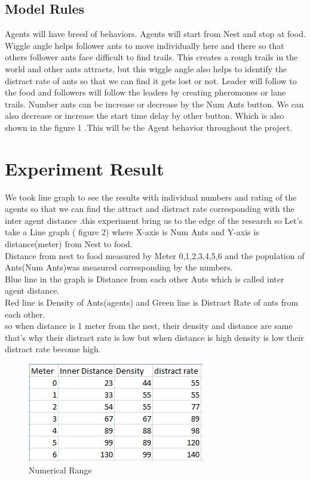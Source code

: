 \documentclass[conference]{IEEEtran}
\begin{document}
\subsection{Model Rules}
Agents will have breed of behaviors. Agents will start from Nest and stop at food.\\ 
Wiggle angle helps follower ants to move individually here and there so that others follower ants face difficult to find trails. This creates a rough trails in the world and other ants attracts, but this wiggle angle also helps to identify the distract rate of ants so that we can find it gets lost or not. Leader will follow to the food and followers will follow the leaders by creating pheromones or lane trails. Number ants can be increase or decrease by the Num Ants button. We can also decrease or increase the start time delay by other button. Which is also shown in the figure 1 .This will be the Agent behavior throughout the project. 

\section{Experiment Result}
We took line graph to see the results with individual numbers and rating of the agents so that we can find the attract and distract rate corresponding with the inter agent distance .this experiment bring us to the edge of the research so Let's take a Line graph ( figure 2) where X-axis is Num Ants and Y-axis is distance(meter) from Nest to food.\\ 
Distance from nest to food measured by Meter 0,1,2,3,4,5,6 and the population of Ants(Num Ants)was measured corresponding by the numbers.\\
Blue line in the graph  is Distance from each other Ants which is called inter agent distance.\\
Red line is Density of Ants(agents) and Green line is Distract Rate of ants from each other.\\
so when distance is 1 meter from the nest, their density and distance are same that's why their distract rate is low but when distance is high density is low their distract rate become high.\\
\begin{figure}[!h]
\centering
\includegraphics[scale=0.9]{Capture.png}
\caption{Numerical Range}
\label{fig_sim}
\end{figure} 
\end{document}
